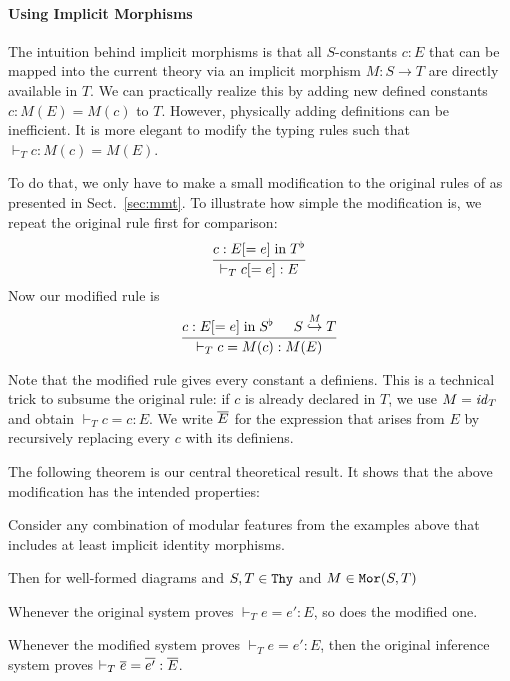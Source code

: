 \paragraph{Using Implicit Morphisms}
The intuition behind implicit morphisms is that all $S$-constants $c:E$ that can be mapped into the current theory via an implicit morphism $M:S\to T$ are directly available in $T$.
We can practically realize this by adding new defined constants $c:M(E)=M(c)$ to $T$.
However, physically adding definitions can be inefficient.
It is more elegant to modify the typing rules such that $\vdash_T c:M(c)=M(E)$.

To do that, we only have to make a small modification to the original rules of \mmt as presented in Sect.~\ref{sec:mmt}.
To illustrate how simple the modification is, we repeat the original rule first for comparison:
\[\rul{c:E[=e] \minn \flt{T}}{\vdash_T c[=e]:E}\]
Now our modified rule is
\[\rul{c:E[=e] \minn \flt{S}\tb \ipc{M}{S}{T}}{\vdash_T c=M(c):M(E)}\]

Note that the modified rule gives every constant a definiens.
This is a technical trick to subsume the original rule: if $c$ is already declared in $T$, we use $M=\id{T}$ and obtain $\vdash_T c=c:E$.
We write $\ov{E}$ for the expression that arises from $E$ by recursively replacing every $c$ with its definiens.

The following theorem is our central theoretical result.
It shows that the above modification has the intended properties:
\begin{theorem}
Consider any combination of modular features from the examples above that includes at least implicit identity morphisms.

Then for well-formed diagrams and $S,T\in\Thy$ and $M\in\Mo{S}{T}$
\begin{compactenum}
 \item Whenever the original system proves $\vdash_T e=e':E$, so does the modified one.
 \item Whenever the modified system proves $\vdash_T e=e':E$, then the original inference system proves $\vdash_T \ov{e}=\ov{e'}:\ov{E}$.
\end{compactenum}
\end{theorem}

